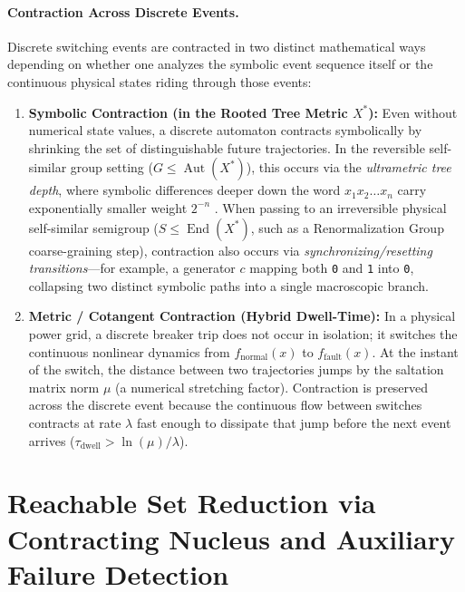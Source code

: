 \documentclass[11pt]{article}
\begin{document}
\paragraph{Contraction Across Discrete Events.}
Discrete switching events are contracted in two distinct mathematical ways depending on whether one analyzes the symbolic event sequence itself or the continuous physical states riding through those events:
\begin{enumerate}
    \item \textbf{Symbolic Contraction (in the Rooted Tree Metric $X^*$):} Even without numerical state values, a discrete automaton contracts symbolically by shrinking the set of distinguishable future trajectories. In the reversible self-similar group setting ($G \le \operatorname{Aut}(X^*)$), this occurs via the \emph{ultrametric tree depth}, where symbolic differences deeper down the word $x_1 x_2 \dots x_n$ carry exponentially smaller weight $2^{-n}$ \cite{Nekrashevych2005}. When passing to an irreversible physical self-similar semigroup ($S \le \operatorname{End}(X^*)$, such as a Renormalization Group coarse-graining step), contraction also occurs via \emph{synchronizing/resetting transitions}---for example, a generator $c$ mapping both \texttt{0} and \texttt{1} into \texttt{0}, collapsing two distinct symbolic paths into a single macroscopic branch.
    \item \textbf{Metric / Cotangent Contraction (Hybrid Dwell-Time):} In a physical power grid, a discrete breaker trip does not occur in isolation; it switches the continuous nonlinear dynamics from $f_{\mathrm{normal}}(x)$ to $f_{\mathrm{fault}}(x)$. At the instant of the switch, the distance between two trajectories jumps by the saltation matrix norm $\mu$ (a numerical stretching factor). Contraction is preserved across the discrete event because the continuous flow between switches contracts at rate $\lambda$ fast enough to dissipate that jump before the next event arrives ($\tau_{\mathrm{dwell}} > \ln(\mu)/\lambda$).
\end{enumerate}
\section{Reachable Set Reduction via Contracting Nucleus and Auxiliary Failure Detection}
\end{document}
